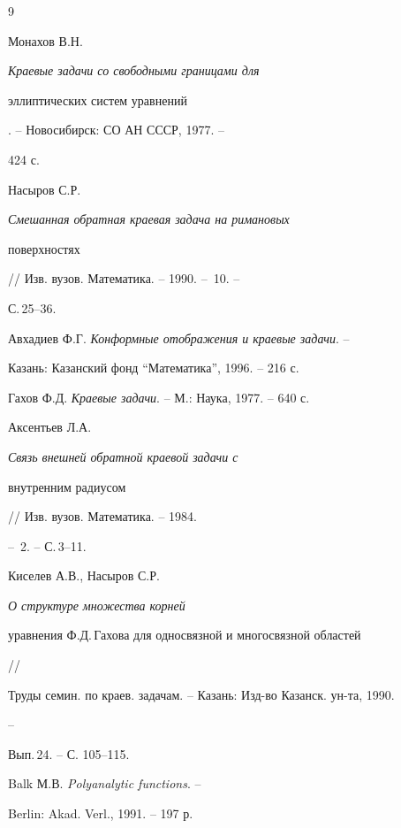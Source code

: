 \begin{thebibliography}{9} 


 




Монахов В.Н. {\em Краевые задачи со свободными границами для 


эллиптических систем уравнений}. -- Новосибирск: СО АН СССР, 1977. -- 


424 с. 




Насыров С.Р. {\em Смешанная обратная краевая задача на римановых 


поверхностях} // Изв. вузов. Математика. -- 1990. -- \No\,10. -- 


С.\,25--36. 




Авхадиев Ф.Г. {\em Конформные отображения и краевые задачи}. -- 


Казань: Казанский фонд ``Математика'', 1996. -- 216 с. 




Гахов Ф.Д. {\em Краевые задачи}. -- М.: Наука, 1977. -- 640 с. 




Аксентьев Л.А. {\em Связь внешней обратной краевой задачи с 


внутренним радиусом} // Изв. вузов. Математика. -- 1984. 


-- \No\,2. -- С.\,3--11. 




Киселев А.В., Насыров С.Р. {\em О структуре множества корней 


уравнения Ф.Д.\,Гахова для односвязной и многосвязной областей} // 


Труды семин. по краев. задачам. -- Казань: Изд-во Казанск. ун-та, 1990. 


-- 


Вып.\,24. -- С. 105--115. 




Balk М.В. {\em Polyanalytic functions}. -- 


Berlin: Akad. Verl., 1991. -- 197 р. 


 


\end{thebibliography} 


 


\vskip 2cm 


 






 


\label{end} 


 


